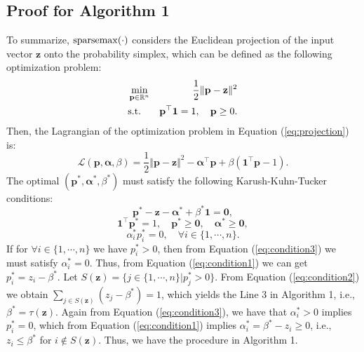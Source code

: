 \documentclass[letterpaper]{article} \usepackage{aaai20}  \usepackage{times}  \usepackage{helvet} \usepackage{courier}  \usepackage[hyphens]{url}  \usepackage{graphicx} \urlstyle{rm} \def\UrlFont{\rm}  \usepackage{graphicx}  \frenchspacing  \setlength{\pdfpagewidth}{8.5in}  \setlength{\pdfpageheight}{11in}
\begin{document}
\subsection{Proof for Algorithm 1}
To summarize, ${\rm sparsemax}(\cdot)$ considers the Euclidean projection of the input vector $\mathbf{z}$ onto the probability simplex, which can be defined as the following optimization problem:
\begin{eqnarray}
	&\min_{\mathbf{p} \in \mathbb{R}^n} & \frac{1}{2} \Vert \mathbf{p} - \mathbf{z} \Vert^2 \nonumber \\
	&{\rm s.t.}& \mathbf{p}^{\top}\mathbf{1} = 1, \quad \mathbf{p} \geq 0.
	\label{eq:projection}
\end{eqnarray}
Then, the Lagrangian of the optimization problem in Equation (\ref{eq:projection}) is:
\begin{equation}
	\mathcal{L}(\mathbf{p},\bm{\alpha},\beta) = \frac{1}{2}\Vert \mathbf{p} - \mathbf{z} \Vert^2 - \bm{\alpha}^{\top}\mathbf{p} + \beta(\mathbf{1}^{\top}\mathbf{p} - 1).
	\label{eq:lagrangian}
\end{equation}
The optimal $(\mathbf{p}^*, \bm{\alpha}^*, {\beta}^*)$ must satisfy the following Karush-Kuhn-Tucker conditions:
\begin{equation}
	\mathbf{p}^* - \mathbf{z} - \bm{\alpha}^* + {\beta}^*\mathbf{1} = \mathbf{0},
	\label{eq:condition1}
\end{equation}
\begin{equation}
	\mathbf{1}^{\top}\mathbf{p}^* = 1, \quad \mathbf{p}^* \geq \mathbf{0}, \quad \bm{\alpha}^* \geq \mathbf{0},
	\label{eq:condition2}
\end{equation}
\begin{equation}
	\alpha_i^*p_i^* = 0, \quad \forall i \in \{1, \cdots, n\}.
	\label{eq:condition3}
\end{equation}
If for $\forall i \in \{1, \cdots, n\}$ we have $p_i^* > 0$, then from Equation (\ref{eq:condition3}) we must satisfy $\alpha_i^* = 0$. Thus, from Equation (\ref{eq:condition1}) we can get $p_i^* = z_i - \beta^*$. Let $S(\mathbf{z}) = \{j \in \{1,\cdots,n\}|p_j^*>0\}$. From Equation (\ref{eq:condition2}) we obtain $\sum_{j\in S(\mathbf{z})}(z_j-\beta^*) = 1$, which yields the Line 3 in Algorithm 1, i.e., $\beta^*=\tau(\mathbf{z})$. Again from Equation (\ref{eq:condition3}), we have that $\alpha_i^* >0$ implies $p_i^*=0$, which from Equation (\ref{eq:condition1}) implies $\alpha_i^* = \beta^* - z_i \geq 0$, i.e., $z_i \leq \beta^*$ for $i \notin S(\mathbf{z})$. Thus, we have the procedure in Algorithm 1.
\end{document}
